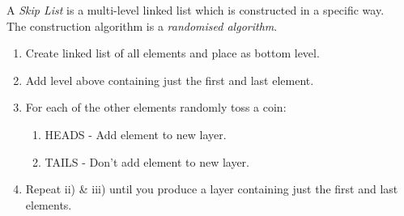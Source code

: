 \documentclass[11pt,a4paper]{article}
\begin{document}
A \textit{Skip List} is a multi-level linked list which is constructed in a specific way.\\
The construction algorithm is a \textit{randomised algorithm}.
\begin{enumerate}[label=\roman*)]
  \item Create linked list of all elements and place as bottom level.
  \item Add level above containing just the first and last element.
  \item For each of the other elements randomly toss a coin:
  \begin{enumerate}
    \item HEADS - Add element to new layer.
    \item TAILS - Don't add element to new layer.
  \end{enumerate}
  \item Repeat ii) \& iii) until you produce a layer containing just the first and last elements.
\end{enumerate}
\end{document}
